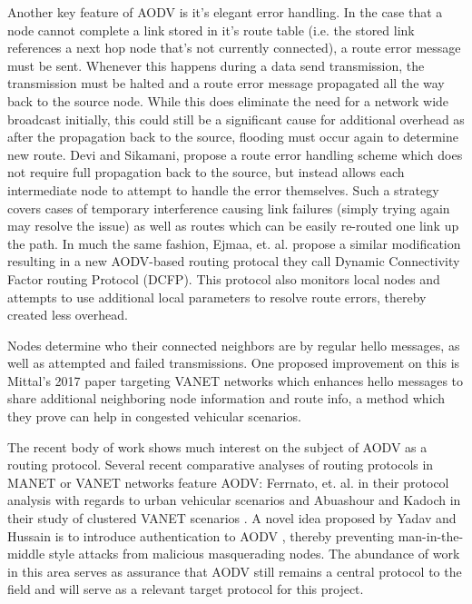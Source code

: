 \documentclass[conference]{IEEEtran}
\begin{document}
Another key feature of AODV is it's elegant error handling. In the case that a node cannot complete a link stored in it's route table (i.e. the stored link references a next hop node that's not currently connected), a route error message must be sent. Whenever this happens during a data send transmission, the transmission must be halted and a route error message propagated all the way back to the source node. While this does eliminate the need for a network wide broadcast initially, this could still be a significant cause for additional overhead as after the propagation back to the source, flooding must occur again to determine new route. Devi and Sikamani, \cite{6675942} propose a route error handling scheme which does not require full propagation back to the source, but instead allows each intermediate node to attempt to handle the error themselves. Such a strategy covers cases of temporary interference causing link failures (simply trying again may resolve the issue) as well as routes which can be easily re-routed one link up the path. In much the same fashion, Ejmaa, et. al. \cite{aodv_interest_overhead} propose a similar modification resulting in a new AODV-based routing protocal they call Dynamic Connectivity Factor routing Protocol (DCFP). This protocol also monitors local nodes and attempts to use additional local parameters to resolve route errors, thereby created less overhead.

Nodes determine who their connected neighbors are by regular hello messages, as well as attempted and failed transmissions. One proposed improvement on this is Mittal's 2017 paper \cite{8344719} targeting VANET networks which enhances hello messages to share additional neighboring node information and route info, a method which they prove can help in congested vehicular scenarios.

The recent body of work shows much interest on the subject of AODV as a routing protocol. Several recent comparative analyses of routing protocols in MANET or VANET networks feature AODV: Ferrnato, et. al. in their protocol analysis with regards to urban vehicular scenarios \cite{aodv_interest_urban} and Abuashour and Kadoch in their study of clustered VANET scenarios \cite{aodv_interest_vanet}. A novel idea proposed by Yadav and Hussain is to introduce authentication to AODV \cite{8203733}, thereby preventing man-in-the-middle style attacks from malicious masquerading nodes. The abundance of work in this area serves as assurance that AODV still remains a central protocol to the field and will serve as a relevant target protocol for this project.
\end{document}
